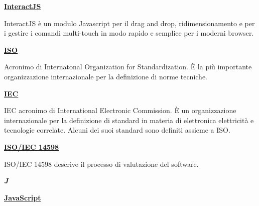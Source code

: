 \bigskip
\begin{addmargin}[0em]{0em}		
	\textbf{\underline{InteractJS}}
\end{addmargin}

\medskip
\begin{addmargin}[5em]{1em}	
InteractJS è un modulo Javascript per il drag and drop, ridimensionamento e per i gestire i comandi multi-touch in modo rapido e semplice per i moderni browser.
\end{addmargin}

\bigskip
\begin{addmargin}[0em]{0em}
	\textbf{\underline{ISO}}
\end{addmargin}
	
\medskip
\begin{addmargin}[5em]{1em}	
Acronimo di Internatonal Organization for Standardization. È la più importante organizzazione internazionale per la definizione di norme tecniche. 
\end{addmargin}

\bigskip
\begin{addmargin}[0em]{0em}
	\textbf{\underline{IEC}}
\end{addmargin}
	
\medskip
\begin{addmargin}[5em]{1em}	
IEC acronimo di International Electronic Commission. È un organizzazione internazionale per la definizione di standard in materia di elettronica elettricità e tecnologie correlate. Alcuni dei suoi standard sono definiti assieme a ISO.
\end{addmargin}	

\bigskip
\begin{addmargin}[0em]{0em}
	\textbf{\underline{ISO/IEC 14598}}
\end{addmargin}
	
\medskip
\begin{addmargin}[5em]{1em}	
ISO/IEC 14598 descrive il processo di valutazione del software.  
\end{addmargin}	

\newpage

\cleardoublepage
{}
{}
\noindent\hrulefill\hspace{4mm}\textbf{\textsl{\Huge{J}}}\hspace{4mm}\hrulefill

\vspace*{2\bigskipamount}

\begin{addmargin}[0em]{0em}	
	\textbf{\underline{JavaScript}}
\end{addmargin}

